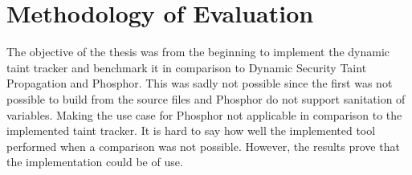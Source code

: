 \section{Methodology of Evaluation}
\label{methev}
The objective of the thesis was from the beginning to implement the dynamic taint tracker and benchmark it in comparison to Dynamic Security Taint Propagation and Phosphor. This was sadly not possible since the first was not possible to build from the source files and Phosphor do not support sanitation of variables. Making the use case for Phosphor not applicable in comparison to the implemented taint tracker. It is hard to say how well the implemented tool performed when a comparison was not possible. However, the results prove that the implementation could be of use.